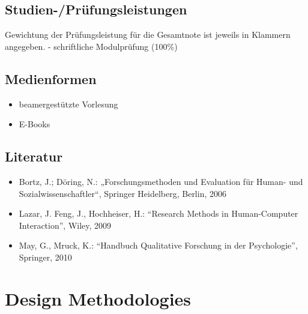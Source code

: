 \section*{Studien-/Prüfungsleistungen\label{/mi-2017/modulbeschreibungen-master/MA_All_Research_Methods}}\label{studien-pruxfcfungsleistungenpathlabelmi-2017modulbeschreibungen-mastermaux5fallux5fresearchux5fmethods}

Gewichtung der Prüfungsleistung für die Gesamtnote ist jeweils in
Klammern angegeben. - schriftliche Modulprüfung (100\%)

\section*{Medienformen\label{/mi-2017/modulbeschreibungen-master/MA_All_Research_Methods}}\label{medienformenpathlabelmi-2017modulbeschreibungen-mastermaux5fallux5fresearchux5fmethods}

\begin{itemize}
\tightlist
\item
  beamergestützte Vorlesung
\item
  E-Books
\end{itemize}

\section*{Literatur\label{/mi-2017/modulbeschreibungen-master/MA_All_Research_Methods}}\label{literaturpathlabelmi-2017modulbeschreibungen-mastermaux5fallux5fresearchux5fmethods}

\begin{itemize}
\tightlist
\item
  Bortz, J.; Döring, N.: „Forschungsmethoden und Evaluation für Human-
  und Sozialwissenschaftler``, Springer Heidelberg, Berlin, 2006
\item
  Lazar, J. Feng, J., Hochheiser, H.: ``Research Methods in
  Human-Computer Interaction'', Wiley, 2009
\item
  May, G., Mruck, K.: ``Handbuch Qualitative Forschung in der
  Psychologie'', Springer, 2010
\end{itemize}

\chapter{Design
Methodologies\label{/mi-2017/modulbeschreibungen-master/MA_HCI_Design_Methodologies}}\label{design-methodologiespathlabelmi-2017modulbeschreibungen-mastermaux5fhciux5fdesignux5fmethodologies}

